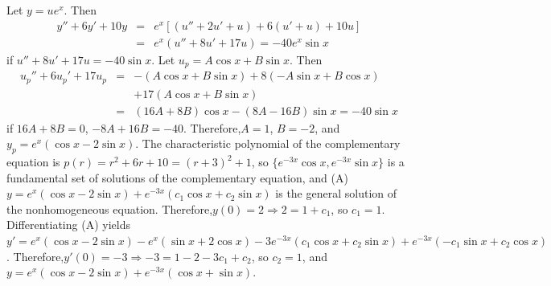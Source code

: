 \documentclass[dvips]{book}
\renewcommand{\exer}[1]{\par\medskip\;\noindent{\color{red}\bf #1.}}
\numberwithin{example}{section}
\numberwithin{equation}{section}
\numberwithin{theorem}{section}
\numberwithin{table}{section}
\numberwithin{figure}{section}
\begin{document}
\exer{5.5.24}
Let $y=ue^x$. Then
\begin{eqnarray*}
y''+6y'+10y&=&e^x\left[(u''+2u'+u)+6(u'+u)+10u\right]\\
&=&e^x(u''+8u'+17u)=
-40e^x\sin x
\end{eqnarray*}
 if  $u''+8u'+17u=-40\sin x$.
Let $u_p=A\cos x+B\sin x$. Then
\begin{eqnarray*}
u_p''+6u_p'+17u_p&=&-(A\cos x+B\sin x)+8(-A\sin x+B\cos x)\\
&&+17(A\cos x+B\sin x)\\ &=& (16A+8B)\cos x-(8A-16B)\sin
x=-40\sin x
\end{eqnarray*}
if $16A+8B=0$, $-8A+16B=-40$. Therefore,$A=1$, $B=-2$, and
$y_p=e^x(\cos x-2\sin x)$. The characteristic polynomial of the
complementary equation is $p(r)=r^2+6r+10=(r+3)^2+1$, so
$\{e^{-3x}\cos x,e^{-3x}\sin x\}$ is a fundamental set of solutions
of the complementary equation, and (A) $y=e^x(\cos x-2\sin
x)+e^{-3x}(c_1\cos x+c_2\sin x)$ is the general solution of the
nonhomogeneous equation. Therefore,$y(0)=2\Rightarrow 2=1+c_1$, so
$c_1=1$. Differentiating (A) yields $y'=e^x(\cos x-2\sin x)-e^x(\sin
x+2\cos x) -3e^{-3x}(c_1\cos x+c_2\sin x) +e^{-3x}(-c_1\sin x+c_2\cos
x)$. Therefore,$y'(0)=-3\Rightarrow -3=1-2-3c_1+c_2$, so $c_2=1$, and
$y=e^x(\cos x-2\sin x)+e^{-3x}(\cos x+\sin x)$.
\end{document}
